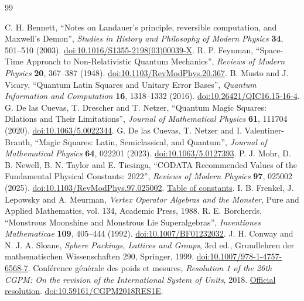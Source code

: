 \begin{thebibliography}{99}
{}
 C. H. Bennett, ``Notes on Landauer's principle,
reversible computation, and Maxwell's Demon'', \emph{Studies in History
and Philosophy of Modern Physics} \textbf{34}, 501--510 (2003).
\href{https://doi.org/10.1016/S1355-2198(03)00039-X}{doi:10.1016/S1355-2198(03)00039-X}.
 R. P. Feynman, ``Space-Time Approach to Non-Relativistic Quantum Mechanics'', \emph{Reviews of Modern Physics} \textbf{20}, 367--387 (1948). \href{https://doi.org/10.1103/RevModPhys.20.367}{doi:10.1103/RevModPhys.20.367}.
 B. Musto and J. Vicary, ``Quantum Latin Squares and Unitary Error Bases'', \emph{Quantum Information and Computation} \textbf{16}, 1318--1332 (2016). \href{https://doi.org/10.26421/QIC16.15-16-4}{doi:10.26421/QIC16.15-16-4}.
 G. De las Cuevas, T. Drescher and T. Netzer, ``Quantum Magic Squares: Dilations and Their Limitations'', \emph{Journal of Mathematical Physics} \textbf{61}, 111704 (2020). \href{https://doi.org/10.1063/5.0022344}{doi:10.1063/5.0022344}.
 G. De las Cuevas, T. Netzer and I. Valentiner-Branth, ``Magic Squares: Latin, Semiclassical, and Quantum'', \emph{Journal of Mathematical Physics} \textbf{64}, 022201 (2023). \href{https://doi.org/10.1063/5.0127393}{doi:10.1063/5.0127393}.
 P. J. Mohr, D. B. Newell, B. N. Taylor and E. Tiesinga, ``CODATA Recommended Values of the Fundamental Physical Constants: 2022'', \emph{Reviews of Modern Physics} \textbf{97}, 025002 (2025). \href{https://doi.org/10.1103/RevModPhys.97.025002}{doi:10.1103/RevModPhys.97.025002}. \href{https://physics.nist.gov/cuu/Constants/Table/allascii.txt}{Table of constants}.
 I. B. Frenkel, J. Lepowsky and A. Meurman, \emph{Vertex Operator Algebras and the Monster}, Pure and Applied Mathematics, vol. 134, Academic Press, 1988.
 R. E. Borcherds, ``Monstrous Moonshine and Monstrous Lie Superalgebras'', \emph{Inventiones Mathematicae} \textbf{109}, 405--444 (1992). \href{https://doi.org/10.1007/BF01232032}{doi:10.1007/BF01232032}.
 J. H. Conway and N. J. A. Sloane, \emph{Sphere Packings, Lattices and Groups}, 3rd ed., Grundlehren der mathematischen Wissenschaften 290, Springer, 1999. \href{https://doi.org/10.1007/978-1-4757-6568-7}{doi:10.1007/978-1-4757-6568-7}.
 Conférence générale des poids et mesures, \emph{Resolution 1 of the 26th CGPM: On the revision of the International System of Units}, 2018. \href{https://www.bipm.org/en/committees/cg/cgpm/26-2018/resolution-1}{Official resolution}. \href{https://doi.org/10.59161/CGPM2018RES1E}{doi:10.59161/CGPM2018RES1E}.

\end{thebibliography}
